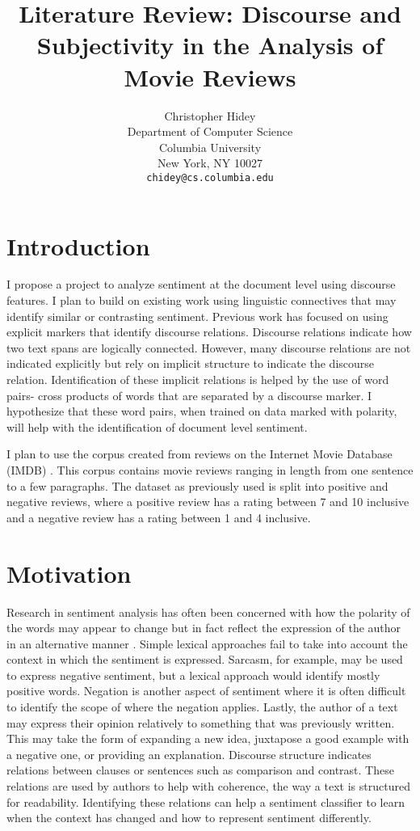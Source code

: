 \documentclass[11pt,letterpaper]{article}
\title{Literature Review: Discourse and Subjectivity in the Analysis of Movie Reviews}
\author{Christopher Hidey \\
Department of Computer Science \\
Columbia University \\
New York, NY 10027 \\
{\tt chidey@cs.columbia.edu} \\
}
\date{}
\begin{document}
\maketitle

\section{Introduction}
I propose a project to analyze sentiment at the document level using discourse
features. I plan to build on existing work using linguistic connectives
that may identify similar or contrasting sentiment. Previous work has focused on using explicit markers
that identify discourse relations.  Discourse relations indicate how two text spans
are logically connected. However, many discourse relations are not indicated explicitly but rely
on implicit structure to indicate the discourse relation.  Identification of these implicit relations is helped by 
the use of word pairs- cross products of words that are separated by a discourse marker.  I hypothesize that these word pairs,
when trained on data marked with polarity, will help with the identification of document level sentiment.

I plan to use the corpus created from reviews on the Internet Movie Database (IMDB) \cite{IMDB}.  This corpus contains
movie reviews ranging in length from one sentence to a few paragraphs.  The dataset as previously used is split into positive and 
negative reviews, where a positive review has a rating between 7 and 10 inclusive and a negative review has a rating between 1 and 4 inclusive.

\section{Motivation}
Research in sentiment analysis has often been concerned with how the polarity of the words may appear to change but in fact reflect the expression of the author 
in an alternative manner \cite{Lee}. Simple lexical approaches fail to take into account the context in which the sentiment is expressed. Sarcasm, for example, may be used to express negative sentiment, but a lexical approach would identify mostly positive words. Negation is another aspect of sentiment where it is often difficult to identify the scope of where the negation applies.
Lastly, the author of a text may express their opinion relatively to something that was previously written.  This may take the form of expanding a new idea, juxtapose a good example with a negative one, or providing an explanation.  Discourse structure indicates relations between clauses or sentences such as comparison and contrast.  These relations are used by authors to help with coherence, the way a text is structured for readability.  Identifying these relations can help a sentiment classifier to learn when the context has changed and how to represent sentiment differently.
\end{document}
